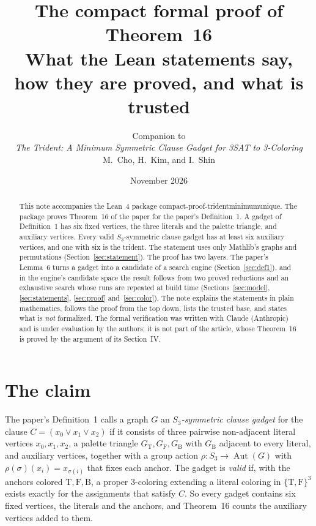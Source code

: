 \documentclass[11pt,a4paper]{article}
\title{The compact formal proof of Theorem~16\\[2pt]
\large What the Lean statements say, how they are proved, and what is trusted}
\author{Companion to\\ \emph{The Trident: A Minimum Symmetric Clause Gadget for 3SAT to 3-Coloring}\\
M.~Cho, H.~Kim, and I.~Shin}
\date{November 2026}
\newcommand{\leanus}{\textunderscore\allowbreak}
\newcommand{\lean}[1]{{\ttfamily\let\_\leanus #1}}
\newcommand{\GT}{G_{\mathrm{T}}}
\newcommand{\GF}{G_{\mathrm{F}}}
\newcommand{\GB}{G_{\mathrm{B}}}
\newcommand{\T}{\mathrm{T}}
\newcommand{\F}{\mathrm{F}}
\newcommand{\B}{\mathrm{B}}
\theoremstyle{definition}
\begin{document}
\maketitle

\begin{abstract}
\noindent
This note accompanies the Lean~4 package
\lean{compact-proof-trident\_minimum\_unique}. The package proves Theorem~16
of the paper for the paper's Definition~1. A gadget of Definition~1 has six
fixed vertices, the three literals and the palette triangle, and auxiliary
vertices. Every valid $S_3$-symmetric clause gadget has at least six
auxiliary vertices, and one with six is the trident. The statement uses only
Mathlib's graphs and permutations (Section~\ref{sec:statement}). The proof has two layers. The
paper's Lemma~6 turns a gadget into a candidate of a search engine
(Section~\ref{sec:def1}), and in the engine's candidate space the result
follows from two proved reductions and an exhaustive search whose runs are
repeated at build time (Sections~\ref{sec:model}, \ref{sec:statements},
\ref{sec:proof} and~\ref{sec:color}). The note
explains the statements in plain mathematics, follows the proof from the top
down, lists the trusted base, and states what is \emph{not} formalized.
The formal verification was written with Claude (Anthropic) and is under
evaluation by the authors; it is not part of the article, whose Theorem~16 is
proved by the argument of its Section~IV.
\end{abstract}

\tableofcontents

\section{The claim}\label{sec:claim}

The paper's Definition~1 calls a graph $G$ an \emph{$S_3$-symmetric clause
gadget} for the clause $C=(x_0\lor x_1\lor x_2)$ if it consists of three
pairwise non-adjacent literal vertices $x_0,x_1,x_2$, a palette triangle
$\GT,\GF,\GB$ with $\GB$ adjacent to every literal, and auxiliary vertices,
together with a group action $\rho:S_3\to\operatorname{Aut}(G)$ with
$\rho(\sigma)(x_i)=x_{\sigma(i)}$ that fixes each anchor. The gadget is
\emph{valid} if, with the anchors colored $\T,\F,\B$, a proper 3-coloring
extending a literal coloring in $\{\T,\F\}^3$ exists exactly for the
assignments that satisfy $C$. So every gadget contains six fixed vertices,
the literals and the anchors, and Theorem~16 counts the auxiliary vertices
added to them.
\end{document}
